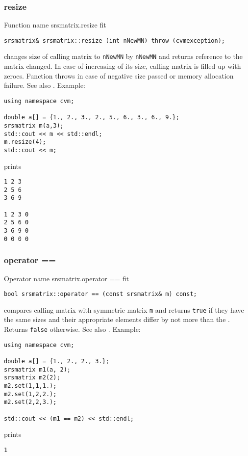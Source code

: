 \subsubsection{resize}
Function%
\pdfdest name {srsmatrix.resize} fit
\begin{verbatim}
srsmatrix& srsmatrix::resize (int nNewMN) throw (cvmexception);
\end{verbatim}
changes  size of  calling matrix to \verb"nNewMN" by \verb"nNewMN"
and returns  reference to
the matrix changed. In case of increasing of its size, calling matrix
is filled up with zeroes.
Function throws  
in case of negative size passed or memory allocation failure.
See also .
Example:
\begin{Verbatim}
using namespace cvm;

double a[] = {1., 2., 3., 2., 5., 6., 3., 6., 9.};
srsmatrix m(a,3);
std::cout << m << std::endl;
m.resize(4);
std::cout << m;
\end{Verbatim}
prints
\begin{Verbatim}
1 2 3
2 5 6
3 6 9

1 2 3 0
2 5 6 0
3 6 9 0
0 0 0 0
\end{Verbatim}
\newpage


\subsubsection{operator ==}
Operator%
\pdfdest name {srsmatrix.operator ==} fit
\begin{verbatim}
bool srsmatrix::operator == (const srsmatrix& m) const;
\end{verbatim}
compares  calling  matrix with symmetric matrix \verb"m"
and returns \verb"true" if they have the same sizes
and their appropriate elements differ by not more than the
.
Returns \verb"false" otherwise.
See also .
Example:
\begin{Verbatim}
using namespace cvm;

double a[] = {1., 2., 2., 3.};
srsmatrix m1(a, 2);
srsmatrix m2(2);
m2.set(1,1,1.); 
m2.set(1,2,2.);
m2.set(2,2,3.);

std::cout << (m1 == m2) << std::endl;
\end{Verbatim}
prints
\begin{Verbatim}
1
\end{Verbatim}
\newpage




